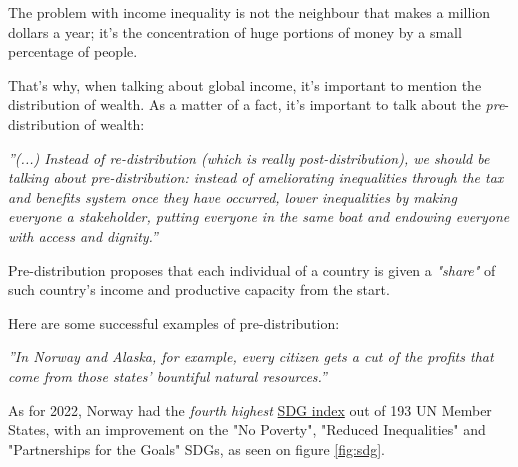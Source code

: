 \begin{enumerate}
The problem with income inequality is not the neighbour that makes a million dollars a year; it's the concentration of huge portions of money by a small percentage of people.

That's why, when talking about global income, it's important to mention the distribution of wealth. As a matter of a fact, it's important to talk about the \textit{pre}-distribution of wealth:

\begin{flushright}
   \textsl{''(...) Instead of \textit{re}-distribution (which is really ­\textit{post}-distribution), we should be talking about \textit{pre}-distribution: instead of ameliorating inequalities through the tax and benefits system once they have occurred, lower inequalities by making everyone a stakeholder, putting everyone in the same boat and endowing everyone with access and dignity.'' \cite{twp}} \\
\end{flushright}

Pre-distribution proposes that each individual of a country is given a \textit{"share"} of such country's income and productive capacity from the start.

Here are some successful examples of pre-distribution:

\begin{flushright}
   \textsl{''In Norway and Alaska, for example, every citizen gets a cut of the profits that come from those states’ bountiful natural resources.'' \cite{twp}} \\

\end{flushright}

As for 2022, Norway had the \textit{fourth highest} \href{https://dashboards.sdgindex.org/rankings}{SDG index} out of 193 UN Member States, with an improvement on the "No Poverty", "Reduced Inequalities" and "Partnerships for the Goals" SDGs, as seen on figure \ref{fig:sdg}.


\end{enumerate}
